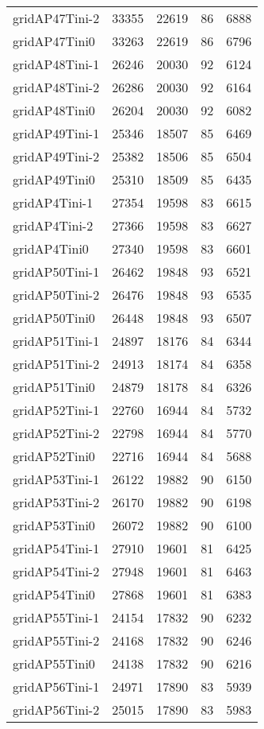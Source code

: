 \begin{longtable}{lrrrr}
gridAP47Tini-2 & 33355 & 22619 & 86 & 6888 \\
gridAP47Tini0 & 33263 & 22619 & 86 & 6796 \\
gridAP48Tini-1 & 26246 & 20030 & 92 & 6124 \\
gridAP48Tini-2 & 26286 & 20030 & 92 & 6164 \\
gridAP48Tini0 & 26204 & 20030 & 92 & 6082 \\
gridAP49Tini-1 & 25346 & 18507 & 85 & 6469 \\
gridAP49Tini-2 & 25382 & 18506 & 85 & 6504 \\
gridAP49Tini0 & 25310 & 18509 & 85 & 6435 \\
gridAP4Tini-1 & 27354 & 19598 & 83 & 6615 \\
gridAP4Tini-2 & 27366 & 19598 & 83 & 6627 \\
gridAP4Tini0 & 27340 & 19598 & 83 & 6601 \\
gridAP50Tini-1 & 26462 & 19848 & 93 & 6521 \\
gridAP50Tini-2 & 26476 & 19848 & 93 & 6535 \\
gridAP50Tini0 & 26448 & 19848 & 93 & 6507 \\
gridAP51Tini-1 & 24897 & 18176 & 84 & 6344 \\
gridAP51Tini-2 & 24913 & 18174 & 84 & 6358 \\
gridAP51Tini0 & 24879 & 18178 & 84 & 6326 \\
gridAP52Tini-1 & 22760 & 16944 & 84 & 5732 \\
gridAP52Tini-2 & 22798 & 16944 & 84 & 5770 \\
gridAP52Tini0 & 22716 & 16944 & 84 & 5688 \\
gridAP53Tini-1 & 26122 & 19882 & 90 & 6150 \\
gridAP53Tini-2 & 26170 & 19882 & 90 & 6198 \\
gridAP53Tini0 & 26072 & 19882 & 90 & 6100 \\
gridAP54Tini-1 & 27910 & 19601 & 81 & 6425 \\
gridAP54Tini-2 & 27948 & 19601 & 81 & 6463 \\
gridAP54Tini0 & 27868 & 19601 & 81 & 6383 \\
gridAP55Tini-1 & 24154 & 17832 & 90 & 6232 \\
gridAP55Tini-2 & 24168 & 17832 & 90 & 6246 \\
gridAP55Tini0 & 24138 & 17832 & 90 & 6216 \\
gridAP56Tini-1 & 24971 & 17890 & 83 & 5939 \\
gridAP56Tini-2 & 25015 & 17890 & 83 & 5983 \\

\end{longtable}
